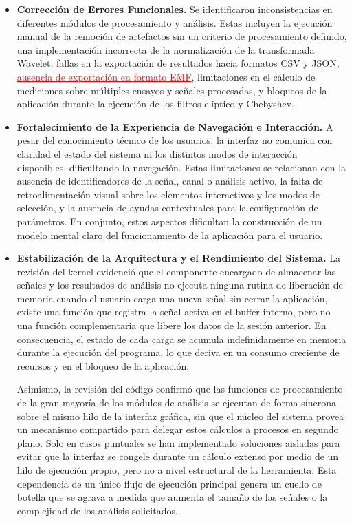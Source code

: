 \documentclass[12pt,letterpaper,oneside]{article}
\begin{document}
\begin{itemize}
  \item \textbf{Corrección de Errores Funcionales.} Se identificaron inconsistencias en diferentes módulos de procesamiento y análisis. Estas incluyen la ejecución manual de la remoción de artefactos sin un criterio de procesamiento definido, una implementación incorrecta de la normalización de la transformada Wavelet, fallas en la exportación de resultados hacia formatos CSV y JSON, \textcolor{red}{\uline{ausencia de exportación en formato EMF}}, limitaciones en el cálculo de mediciones sobre múltiples ensayos y señales procesadas, y bloqueos de la aplicación durante la ejecución de los filtros elíptico y Chebyshev.

  \item \textbf{Fortalecimiento de la Experiencia de Navegación e Interacción.} A pesar del conocimiento técnico de los usuarios, la interfaz no comunica con claridad el estado del sistema ni los distintos modos de interacción disponibles, dificultando la navegación. Estas limitaciones se relacionan con la ausencia de identificadores de la señal, canal o análisis activo, la falta de retroalimentación visual sobre los elementos interactivos y los modos de selección, y la ausencia de ayudas contextuales para la configuración de parámetros. En conjunto, estos aspectos dificultan la construcción de un modelo mental claro del funcionamiento de la aplicación para el usuario.

  \item \textbf{Estabilización de la Arquitectura y el Rendimiento del Sistema.} La revisión del kernel evidenció que el componente encargado de almacenar las señales y los resultados de análisis no ejecuta ninguna rutina de liberación de memoria cuando el usuario carga una nueva señal sin cerrar la aplicación, existe una función que registra la señal activa en el buffer interno, pero no una función complementaria que libere los datos de la sesión anterior. En consecuencia, el estado de cada carga se acumula indefinidamente en memoria durante la ejecución del programa, lo que deriva en un consumo creciente de recursos y en el bloqueo de la aplicación.

  Asimismo, la revisión del código confirmó que las funciones de procesamiento de la gran mayoría de los módulos de análisis se ejecutan de forma síncrona sobre el mismo hilo de la interfaz gráfica, sin que el núcleo del sistema provea un mecanismo compartido para delegar estos cálculos a procesos en segundo plano. Solo en casos puntuales se han implementado soluciones aisladas para evitar que la interfaz se congele durante un cálculo extenso por medio de un hilo de ejecución propio, pero no a nivel estructural de la herramienta. Esta dependencia de un único flujo de ejecución principal genera un cuello de botella que se agrava a medida que aumenta el tamaño de las señales o la complejidad de los análisis solicitados.


\end{itemize}
\end{document}
